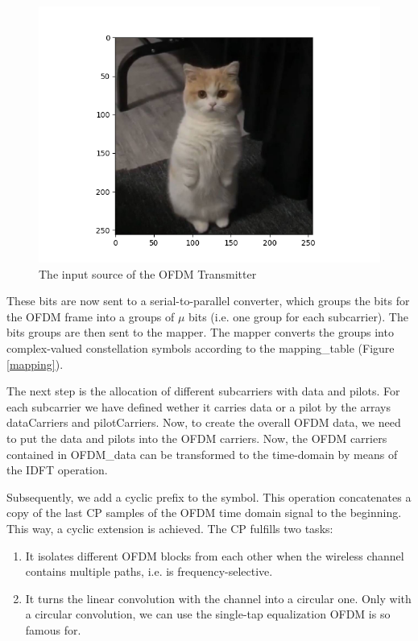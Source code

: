 \begin{figure}[htbp]
    \centering
    \includegraphics[width=\textwidth]{../Source/results/input.png}
    \caption{The input source of the OFDM Transmitter}
    \label{input}
\end{figure}

These bits are now sent to a serial-to-parallel converter, which groups the bits for the OFDM frame into a groups of $\mu$ bits (i.e. one group for each subcarrier). The bits groups are then sent to the mapper. The mapper converts the groups into complex-valued constellation symbols according to the mapping\_table (Figure \ref{mapping}).

The next step is the allocation of different subcarriers with data and pilots. For each subcarrier we have defined wether it carries data or a pilot by the arrays dataCarriers and pilotCarriers. Now, to create the overall OFDM data, we need to put the data and pilots into the OFDM carriers. Now, the OFDM carriers contained in OFDM\_data can be transformed to the time-domain by means of the IDFT operation.

Subsequently, we add a cyclic prefix to the symbol. This operation concatenates a copy of the last CP samples of the OFDM time domain signal to the beginning. This way, a cyclic extension is achieved. The CP fulfills two tasks:
\begin{enumerate}
    \item It isolates different OFDM blocks from each other when the wireless channel contains multiple paths, i.e. is frequency-selective.
    \item It turns the linear convolution with the channel into a circular one. Only with a circular convolution, we can use the single-tap equalization OFDM is so famous for.
\end{enumerate}

